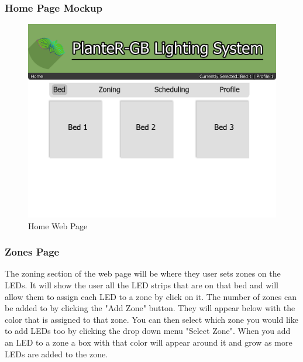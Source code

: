 \documentclass[onecolumn, draftclsnofoot,10pt, compsoc]{IEEEtran}
\begin{document}
			            \subsubsection{Home Page Mockup}
			            \begin{center}
			                \begin{figure}[H]
			                    \includegraphics[width=\linewidth]{web_design/BedPage.png}
			                    \caption{Home Web Page}
			                    \label{fig:Home Page}
			                \end{figure}
			            \end{center}
			            \subsubsection{Zones Page}
			            The zoning section of the web page will be where they user sets zones on
			            the LEDs. It will show the user all the LED strips that are on that bed
			            and will allow them to assign each LED to a zone by click on it. The number
			            of zones can be added to by clicking the "Add Zone" button. They will appear
			            below with the color that is assigned to that zone. You can then select
			            which zone you would like to add LEDs too by clicking the drop down menu "Select Zone".
			            When you add an LED to a zone a box with that color will appear around it
			            and grow as more LEDs are added to the zone.
\end{document}
